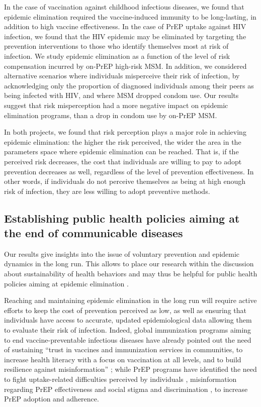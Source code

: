 In the case of vaccination against childhood infectious diseases, we found that epidemic elimination required the vaccine-induced immunity to be long-lasting, in addition to high vaccine effectiveness. In the case of PrEP uptake against HIV infection, we found that the HIV epidemic may be eliminated by targeting the prevention interventions to those who identify themselves most at risk of infection. We study epidemic elimination as a function of the level of risk compensation incurred by on-PrEP high-risk MSM. In addition, we considered  alternative scenarios where individuals misperceive their risk of infection, by acknowledging only the proportion of diagnosed individuals among their peers as being infected with HIV, and where MSM dropped condom use. Our results suggest that risk misperception had a more negative impact on epidemic elimination programs, than a drop in condom use by on-PrEP MSM.

In both projects, we found that risk perception plays a major role in achieving epidemic elimination: the higher the risk perceived, the wider the area in the parameters space where epidemic elimination can be reached. That is, if the perceived risk decreases, the cost that individuals are willing to pay to adopt prevention decreases as well, regardless of the level of prevention effectiveness. In other words, if individuals do not perceive themselves as being at high enough risk of infection, they are less willing to adopt preventive methods. 

\subsection{Establishing public health policies aiming at the end of communicable diseases}

Our results give insights into the issue of voluntary prevention and epidemic dynamics in the long run. This allows to place our research within the discussion about sustainability of health behaviors and may thus be helpful for public health policies aiming at epidemic elimination \cite[]{SDG_Goal3}.  

Reaching and maintaining epidemic elimination in the long run will require active efforts to keep the cost of prevention perceived as low, as well as ensuring that individuals have access to accurate, updated epidemiological data allowing them to evaluate their risk of infection. Indeed, global immunization programs aiming to end vaccine-preventable infectious diseases have already pointed out the need of sustaining ``trust in vaccines and immunization services in communities, to increase health literacy with a focus on vaccination at all levels, and to build resilience against misinformation'' \cite[]{WHO_IA2030}; while PrEP programs have identified the need to fight uptake-related difficulties perceived by individuals \cite[]{Desai2018,Sidebottom2018}, misinformation regarding PrEP effectiveness \cite[]{Young2014,Underhill2016} and social stigma and discrimination \cite[]{Young2014,PerezFigueroa2015,Arnold2016}, to increase PrEP adoption and adherence.


